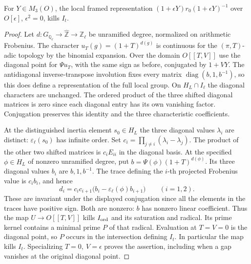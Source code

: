 \begin{lemma}\label{ct:local}
For \(Y\in M_3(O)\), the local framed representation
\((1+\epsilon Y)r_0(1+\epsilon Y)^{-1}\) over \(O[\epsilon]\),
\(\epsilon^2=0\), kills \(I_t\).
\end{lemma}
\begin{proof}
Let \(d:G_{\mathbb Q_\ell}\to\widehat{\mathbb Z}\to\mathbb Z_\ell\)
be unramified degree, normalized on arithmetic Frobenius. The character
\(u_T(g)=(1+T)^{d(g)}\) is continuous for the \((\pi,T)\)-adic
topology by the binomial expansion. Over the domain \(O[[T,V]]\)
use the diagonal point for \(\Psi u_T\), with the same sign as before,
conjugated by \(1+VY\). The antidiagonal inverse-transpose involution
fixes every matrix \(\operatorname{diag}(b,1,b^{-1})\), so this
does define a representation of the full local group. On
\(H_L\cap I_\ell\) the diagonal characters are unchanged. The ordered
product of the three shifted diagonal matrices is zero since each
diagonal entry has its own vanishing factor. Conjugation preserves this
identity and the three characteristic coefficients.

At the distinguished inertia element \(s_0\in H_L\) the three diagonal
values \(\lambda_i\) are distinct: \(\varepsilon_\ell(s_0)\) has
infinite order. Set \(c_i=\prod_{j\ne i}(\lambda_i-\lambda_j)\).
The product of the other two shifted matrices is \(c_iE_{ii}\) in
the diagonal basis. At the specified \(\phi\in H_L\) of nonzero
unramified degree, put \(b=\Psi(\phi)(1+T)^{d(\phi)}\). Its three
diagonal values \(b_i\) are \(b,1,b^{-1}\). The trace defining the
\(i\)-th projected Frobenius value is \(c_i b_i\), and hence
\[
 d_i=c_i c_{i+1}\bigl(b_i-\varepsilon_\ell(\phi)b_{i+1}\bigr)
 \qquad(i=1,2).
\]
These are invariant under the displayed conjugation since all the
elements in the traces have positive sign. Both are nonzero: \(b\)
has nonzero linear coefficient. Thus the map \(U\to O[[T,V]]\)
kills \(I_{\rm ord}\) and its saturation and radical. Its prime kernel
contains a minimal prime \(P\) of that radical. Evaluation at
\(T=V=0\) is the diagonal point, so \(P\) occurs in the intersection
defining \(I_t\). In particular the map kills \(I_t\). Specializing
\(T=0,\ V=\epsilon\) proves the assertion, including when a gap
vanishes at the original diagonal point.
\end{proof}

